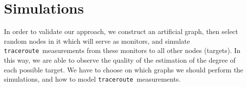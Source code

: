 \documentclass[conference]{IEEEtran}
\newcommand{\traceroute}{{\tt traceroute}}
\begin{document}

\vspace{-0.5em}

\section{Simulations}\label{sec-simulations}




In order to validate our approach, we construct an artificial graph, then select random nodes in it which will serve as monitors, and simulate \traceroute\ measurements from these monitors to all other nodes (targets). In this way, we are able to observe the quality of the estimation of the degree of each possible target.
We have to choose on which graphs we should perform the simulations, and how to model \traceroute\ measurements.
\end{document}
